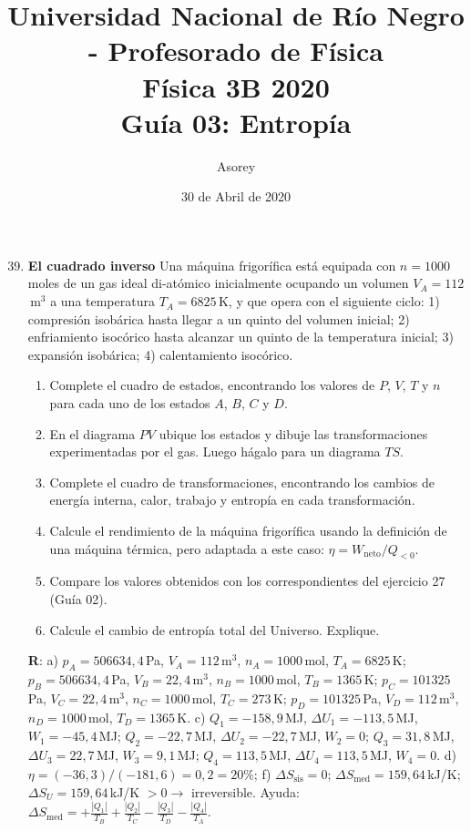 \documentclass[a4paper,12pt]{article}
\begin{document}
\title{
{\normalsize{Universidad Nacional de Río Negro - Profesorado de Física}}\\
Física 3B 2020 \\ Guía 03: Entropía
}
\author{Asorey}
\date{30 de Abril de 2020}
\maketitle

\begin{enumerate}
	\setcounter{enumi}{38}     

    \item {\bf{El cuadrado inverso}}
		Una máquina frigorífica está equipada con $n=1000$\,moles de un gas
		ideal di-atómico inicialmente ocupando un volumen $V_A=112$\,m$^3$ a
		una temperatura $T_A=6825$\,K, y que opera con el siguiente ciclo: 1)
		compresión isobárica hasta llegar a un quinto del volumen inicial; 2)
		enfriamiento isocórico hasta alcanzar un quinto de la temperatura
		inicial; 3) expansión isobárica; 4) calentamiento isocórico.
		\begin{enumerate}
            \item Complete el cuadro de estados, encontrando los valores de
                $P$, $V$, $T$ y $n$ para cada uno de los estados $A$, $B$, $C$
                y $D$.
            \item En el diagrama $PV$ ubique los estados y dibuje las
				transformaciones experimentadas por el gas. Luego hágalo para
				un diagrama $TS$.
            \item Complete el cuadro de transformaciones, encontrando los
                cambios de energía interna, calor, trabajo y entropía en cada
                transformación.
			\item Calcule el rendimiento de la máquina frigorífica usando la
				definición de una máquina térmica, pero adaptada a este caso:
				$\eta=W_{\mathrm{neto}}/Q_{<0}$.
			\item Compare los valores obtenidos con los correspondientes del
				ejercicio 27 (Guía 02).
			\item Calcule el cambio de entropía total del Universo. Explique.
        \end{enumerate}
        {\bf{R}}: a) 
		$p_A=506634,4$\,Pa, $V_A=112$\,m$^3$, $n_A=1000$\,mol, $T_A=6825$\,K; 
		$p_B=506634,4$\,Pa, $V_B=22,4$\,m$^3$, $n_B=1000$\,mol, $T_B=1365$\,K; 
		$p_C=101325$\,Pa, $V_C=22,4$\,m$^3$, $n_C=1000$\,mol, $T_C=273$\,K; 
		$p_D=101325$\,Pa, $V_D=112$\,m$^3$, $n_D=1000$\,mol, $T_D=1365$\,K. 
		c) 
		$Q_1=-158,9$\,MJ, $\Delta U_1=-113,5$\,MJ, $W_1=-45,4$\,MJ;
		$Q_2=-22,7$\,MJ, $\Delta U_2=-22,7$\,MJ, $W_2=0$;
		$Q_3=31,8$\,MJ, $\Delta U_3=22,7$\,MJ, $W_3=9,1$\,MJ; 
        $Q_4=113,5$\,MJ, $\Delta U_4=113,5$\,MJ, $W_4=0$. 
		d) $\eta=(-36,3)/(-181,6) = 0,2 = 20\%$; 
		f) $\Delta S_{\mathrm{sis}} = 0$; $\Delta
		S_{\mathrm{med}}=159,64$\,kJ/K; $\Delta S_U=159,64$\,kJ/K $>0 \to$
		irreversible. Ayuda: $\Delta S_{\mathrm{med}} = +\frac{|Q_1|}{T_B} +
		\frac{|Q_2|}{T_C} - \frac{|Q_3|}{T_D} - \frac{|Q_4|}{T_A}$.
	

\end{enumerate}
\end{document}
